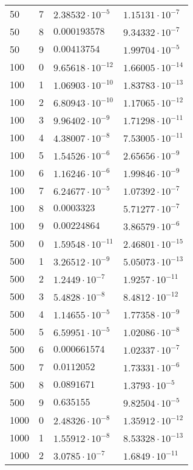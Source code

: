 \documentclass[english]{article}
\begin{document}
\begin{center}
\begin{longtable}{l|l|l|l}
50 & 7 & \(2.38532\cdot 10^{-5} \)& \(1.15131\cdot 10^{-7}\) \\
50 & 8 & \(0.000193578 \)& \(9.34332\cdot 10^{-7}\) \\
50 & 9 & \(0.00413754  \)& \(1.99704\cdot 10^{-5}\) \\
\hline
100 & 0 & \(9.65618\cdot 10^{-12} \)& \(1.66005\cdot 10^{-14}\) \\
100 & 1 & \(1.06903\cdot 10^{-10} \)& \(1.83783\cdot 10^{-13}\) \\
100 & 2 & \(6.80943\cdot 10^{-10} \)& \(1.17065\cdot 10^{-12}\) \\
100 & 3 & \(9.96402\cdot 10^{-9} \)& \(1.71298\cdot 10^{-11}\) \\
100 & 4 & \(4.38007\cdot 10^{-8} \)& \(7.53005\cdot 10^{-11}\) \\
100 & 5 & \(1.54526\cdot 10^{-6} \)& \(2.65656\cdot 10^{-9}\) \\
100 & 6 & \(1.16246\cdot 10^{-6} \)& \(1.99846\cdot 10^{-9}\) \\
100 & 7 & \(6.24677\cdot 10^{-5} \)& \(1.07392\cdot 10^{-7}\) \\
100 & 8 & \(0.0003323   \)& \(5.71277\cdot 10^{-7}\) \\
100 & 9 & \(0.00224864  \)& \(3.86579\cdot 10^{-6}\) \\
\hline
500 & 0 & \(1.59548\cdot 10^{-11} \)& \(2.46801\cdot 10^{-15}\) \\
500 & 1 & \(3.26512\cdot 10^{-9} \)& \(5.05073\cdot 10^{-13}\) \\
500 & 2 & \(1.2449\cdot 10^{-7}  \)& \(1.9257\cdot 10^{-11}\) \\
500 & 3 & \(5.4828\cdot 10^{-8}  \)& \(8.4812\cdot 10^{-12}\) \\
500 & 4 & \(1.14655\cdot 10^{-5} \)& \(1.77358\cdot 10^{-9}\) \\
500 & 5 & \(6.59951\cdot 10^{-5} \)& \(1.02086\cdot 10^{-8}\) \\
500 & 6 & \(0.000661574 \)& \(1.02337\cdot 10^{-7}\) \\
500 & 7 & \(0.0112052   \)& \(1.73331\cdot 10^{-6}\) \\
500 & 8 & \(0.0891671   \)& \(1.3793\cdot 10^{-5}\) \\
500 & 9 & \(0.635155    \)& \(9.82504\cdot 10^{-5}\) \\
\hline
1000 & 0 & \(2.48326\cdot 10^{-8} \)& \(1.35912\cdot 10^{-12}\) \\
1000 & 1 & \(1.55912\cdot 10^{-8} \)& \(8.53328\cdot 10^{-13}\) \\
1000 & 2 & \(3.0785\cdot 10^{-7}  \)& \(1.6849\cdot 10^{-11}\) \\

\end{longtable}
\end{center}
\end{document}
